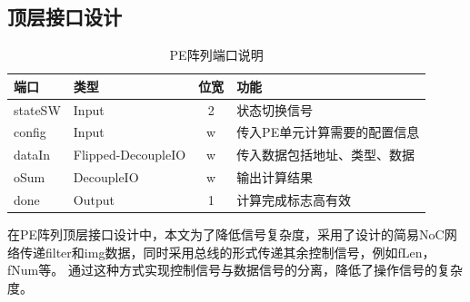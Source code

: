     \subsection{顶层接口设计}
\begin{table}[h] %
    \centering
    \caption{PE阵列端口说明} %
    \begin{tabular}{l|l|c|l} %
    \hline  
    \hline  
    端口 & 类型 & 位宽 & 功能 \\ %
    \hline %
    stateSW & Input & 2 & 状态切换信号 \\
    \hline  
    config & Input & w & 传入PE单元计算需要的配置信息 \\
    \hline  
    dataIn & Flipped-DecoupleIO & w & 传入数据包括地址、类型、数据 \\
    \hline  
    oSum & DecoupleIO & w & 输出计算结果 \\
    \hline  
    done & Output & 1 & 计算完成标志高有效 \\
    \hline  
    \hline  
    \end{tabular}  
\end{table}  
    在PE阵列顶层接口设计中，本文为了降低信号复杂度，采用了设计的简易NoC网络传递filter和img数据，同时采用总线的形式传递其余控制信号，例如fLen，fNum等。
    通过这种方式实现控制信号与数据信号的分离，降低了操作信号的复杂度。
